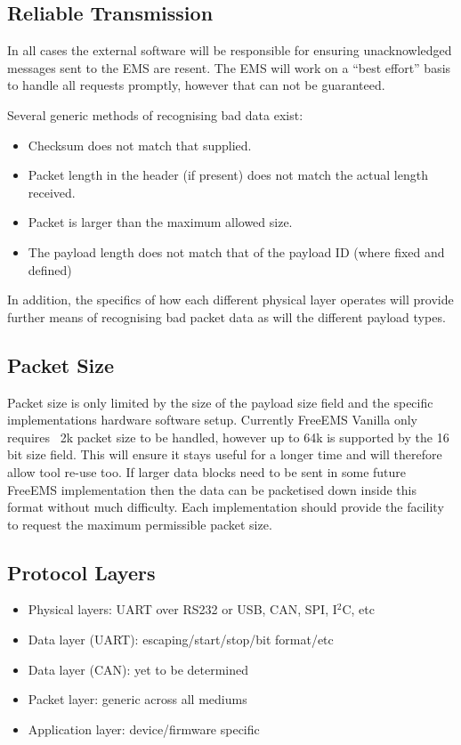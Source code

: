 \documentclass[12pt,a4paper,titlepage]{article}
\begin{document}
\begin{titlepage}
\begin{center}
\subsection{Reliable Transmission}

In all cases the external software will be responsible for ensuring
unacknowledged messages sent to the EMS are resent. The EMS will work on a
``best effort'' basis to handle all requests promptly, however that can not be
guaranteed.

Several generic methods of recognising bad data exist:

\begin{itemize}
\item Checksum does not match that supplied.
\item Packet length in the header (if present) does not match the actual length received.
\item Packet is larger than the maximum allowed size.
\item The payload length does not match that of the payload ID (where fixed and defined)
\end{itemize}

In addition, the specifics of how each different physical layer operates will
provide further means of recognising bad packet data as will the different
payload types.

\subsection{Packet Size}

Packet size is only limited by the size of the payload size field and the
specific implementations hardware software setup. Currently FreeEMS Vanilla
only requires ~2k packet size to be handled, however up to 64k is supported by
the 16 bit size field. This will ensure it stays useful for a longer time and
will therefore allow tool re-use too. If larger data blocks need to be sent in
some future FreeEMS implementation then the data can be packetised down inside
this format without much difficulty. Each implementation should provide the
facility to request the maximum permissible packet size.

\subsection{Protocol Layers}

\begin{itemize}
\item Physical layers: UART over RS232 or USB, CAN, SPI, I$^2$C, etc
\item Data layer (UART): escaping/start/stop/bit format/etc
\item Data layer (CAN): yet to be determined
\item Packet layer: generic across all mediums
\item Application layer: device/firmware specific
\end{itemize}


\end{center}
\end{titlepage}
\end{document}
